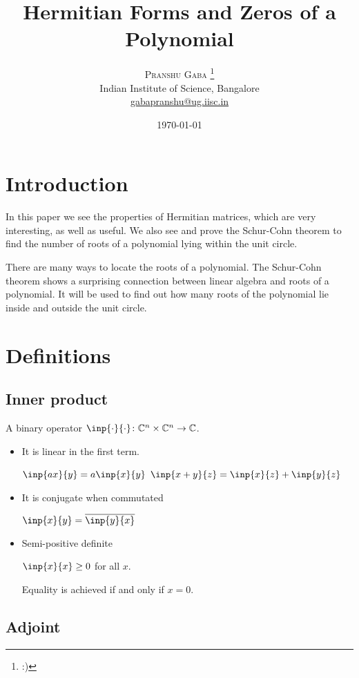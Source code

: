 \documentclass[twofold]{article}
\author{%
\textsc{Pranshu Gaba} \thanks{:)} \\[1ex]
\normalsize Indian Institute of Science, Bangalore \\
\normalsize \href{mailto:gabapranshu@iisc.ac.in}{gabapranshu@ug.iisc.in}}
\title{Hermitian Forms and Zeros of a Polynomial}
\date{\today}
\newcommand*\conj[1]{\overline{#1}}
\theoremstyle{plain}
\theoremstyle{definition}
\begin{document}
\maketitle

\section{Introduction}




In this paper we see the properties of Hermitian matrices, which are very interesting, as well as useful. We also see and prove the Schur-Cohn theorem to find the number of roots of a polynomial lying within the unit circle. 

There are many ways to locate the roots of a polynomial. The Schur-Cohn theorem shows a surprising connection between linear algebra and roots of a polynomial. It will be used to find out how many roots of the polynomial lie inside and outside the unit circle.


\section{Definitions}


\subsection{Inner product}

A binary operator \(\inp{\cdot}{\cdot} \colon \mathbb{C}^n \times \mathbb{C}^n \to \mathbb{C}\). 

\begin{itemize}
\item It is linear in the first term. 

\(\inp{ax}{y} = a \inp{x}{y}\)
\(\inp{x + y}{z} = \inp{x}{z} + \inp{y}{z}\)

\item It is conjugate when commutated

\(\inp{x}{y} = \conj{\inp{y}{x}}\)

\item Semi-positive definite

\(\inp{x}{x} \ge 0\) for all \(x\).

Equality is achieved if and only if \(x = 0\).
\end{itemize}


\subsection{Adjoint}
\end{document}
